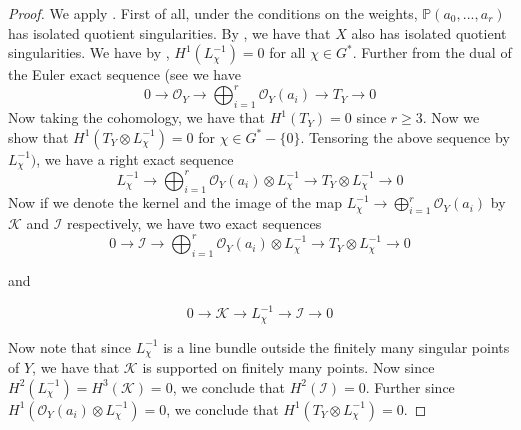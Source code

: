\documentclass[12pt,twoside,]{amsart}
\theoremstyle{plain}
\theoremstyle{definition}
\begin{document}
\begin{proof}
 We apply . First of all, under the conditions on the weights, $\mathbb{P}(a_0,...,a_r)$ has isolated quotient singularities. By , we have that $X$ also has isolated quotient singularities. We have by \cite[Section $1.4$]{dolgachevwps82}, $H^1(L_{\chi}^{-1}) = 0$ for all $\chi \in G^*$.
 Further from the dual of the Euler exact sequence (see \cite[Theorem $8.1.6$]{cox2024toric} we have
 $$0 \to \mathcal{O}_Y \to \bigoplus_{i = 1}^r  \mathcal{O}_Y(a_i) \to T_Y \to 0$$
 Now taking the cohomology, we have that $H^1(T_Y) = 0$ since $r \geq 3$. Now we show that $H^1(T_Y \otimes L_{\chi}^{-1}) = 0$ for $\chi \in G^*-\{0\}$. Tensoring the above sequence by $L_{\chi}^{-1})$, we have a right exact sequence 
 $$L_{\chi}^{-1} \to \bigoplus_{i = 1}^r\mathcal{O}_Y(a_i) \otimes L_{\chi}^{-1} \to T_Y \otimes L_{\chi}^{-1} \to 0$$
 Now if we denote the kernel and the image of the map $L_{\chi}^{-1} \to \bigoplus_{i = 1}^r\mathcal{O}_Y(a_i)$ by $\mathcal{K}$ and $\mathcal{I}$ respectively, we have two exact sequences
 $$0 \to \mathcal{I} \to \bigoplus_{i = 1}^r\mathcal{O}_Y(a_i) \otimes L_{\chi}^{-1} \to T_Y \otimes L_{\chi}^{-1} \to 0$$

and 

$$0 \to \mathcal{K} \to L_{\chi}^{-1} \to \mathcal{I} \to 0$$

Now note that since $L_{\chi}^{-1}$ is a line bundle outside the finitely many singular points of $Y$, we have that $\mathcal{K}$ is supported on finitely many points. Now since $H^2(L_{\chi}^{-1}) = H^3(\mathcal{K}) = 0$, we conclude that $H^2(\mathcal{I}) = 0$. Further since $H^1(\mathcal{O}_Y(a_i) \otimes L_{\chi}^{-1}) = 0$, we conclude that $H^1(T_Y \otimes L_{\chi}^{-1}) = 0$.
 

\end{proof}
\end{document}
